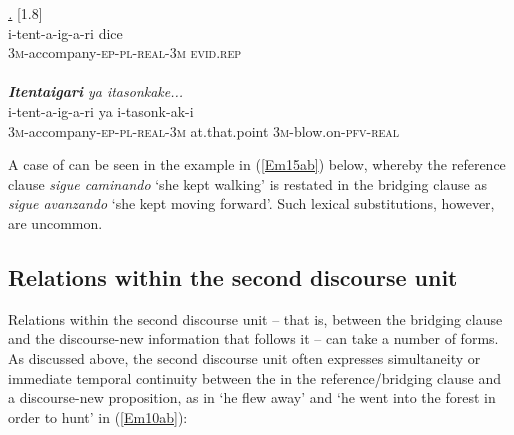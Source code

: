 \documentclass[output=paper]{LSP/langsci}
\begin{document}
\begin{exe}
\ex \label{Em09ab}
\begin{xlist}
\ex \label{Emex:09a}
\glt \textit{ \underline{.}} [1.8]\\
\gll i-tent-a-ig-a-ri dice \\
 \textsc{3m-}accompany\textsc{-ep-pl-real-3m} \textsc{evid.rep}\\
\glt {}\\
\ex \label{Emex:09b}
\glt \textit{\textbf{Itentaigari} ya itasonkake...}\\
\gll i-tent-a-ig-a-ri ya i-tasonk-ak-i\\     	      
   \textsc{3m-}accompany\textsc{-ep-pl-real-3m} at.that.point \textsc{3m-}blow.on\textsc{-pfv-real}\\
\glt {}
\end{xlist}
\end{exe}


A case of  can be seen in the  example in (\ref{Em15ab}) below, whereby the reference clause \textit{sigue caminando} `she kept walking' is restated in the bridging clause as \textit{sigue avanzando} `she kept moving forward'. Such lexical substitutions, however, are uncommon. 
%
\subsection{Relations within the second discourse unit}
\label{Em2ndunit}
Relations within the second discourse unit – that is, between the bridging clause and the discourse-new information that follows it – can take a number of forms. As discussed above, the second discourse unit often expresses simultaneity or immediate temporal continuity between the  in the reference/bridging clause and a discourse-new proposition, as in `he flew away' and `he went into the forest in order to hunt' in (\ref{Em10ab}): 
\end{document}
